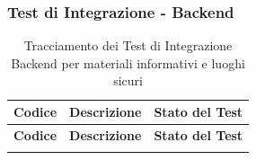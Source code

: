 \documentclass[a4paper,12pt]{article}
\begin{document}
\subsubsection{Test di Integrazione - Backend}\label{sec:test_integrazione_backend}
\begin{longtable}{|l|p{10cm}|c|}
    \hline
    \rowcolor{gray!60}
    \textbf{Codice} & \textbf{Descrizione} & \textbf{Stato del Test} \\
    \hline
    \endfirsthead

    \hline
    \rowcolor{gray!60}
    \textbf{Codice} & \textbf{Descrizione} & \textbf{Stato del Test} \\
    \hline
    \endhead

    \hline
    \endfoot

    \hline
    \caption{Tracciamento dei Test di Integrazione Backend per materiali informativi e luoghi sicuri}
    \endlastfoot


\end{longtable}
\end{document}
